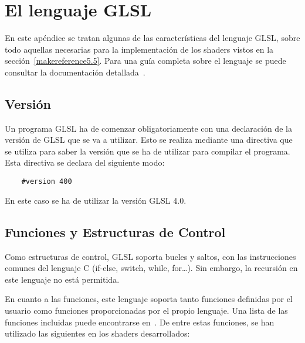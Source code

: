 
\cleardoublepage

\chapter{El lenguaje GLSL}
\label{ApendiceA}

En este apéndice se tratan algunas de las características del lenguaje GLSL,
sobre todo aquellas necesarias para la implementación de los shaders vistos en
la sección~\ref{makereference5.5}. Para una guía completa sobre el lenguaje se
puede consultar la documentación detallada~\cite{GLSLreference}.

\section{Versión}

Un programa GLSL ha de comenzar obligatoriamente con una declaración de la
versión de GLSL que se va a utilizar. Esto se realiza mediante una directiva que
se utiliza para saber la versión que se ha de utilizar para compilar el
programa. Esta directiva se declara del siguiente modo:

\begin{verbatim}
    #version 400
\end{verbatim}
En este caso se ha de utilizar la versión GLSL 4.0.

\section{Funciones y Estructuras de Control}

Como estructuras de control, GLSL soporta bucles y saltos, con las instrucciones
comunes del lenguaje C (if-else, switch, while, for\ldots). Sin embargo, la
recursión en este lenguaje no está permitida. 

En cuanto a las funciones, este lenguaje soporta tanto funciones definidas por
el usuario como funciones proporcionadas por el propio lenguaje. Una lista de
las funciones incluidas puede encontrarse en~\citet{GLSLreference}. De entre
estas funciones, se han utilizado las siguientes en los shaders desarrollados:

